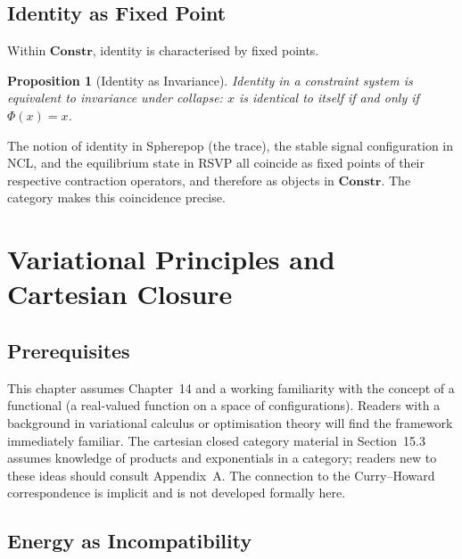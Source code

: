 \documentclass[12pt, oneside]{amsbook}
\theoremstyle{plain}
\newtheorem{proposition}[theorem]{Proposition}
\theoremstyle{definition}
\theoremstyle{remark}
\begin{document}
\section{Identity as Fixed Point}
\label{sec:constr:identity}

Within $\mathbf{Constr}$, identity is characterised by fixed points.

\begin{proposition}[Identity as Invariance]
Identity in a constraint system is equivalent to invariance under collapse:
$x$ is identical to itself if and only if $\Phi(x) = x$.
\end{proposition}

The notion of identity in Spherepop (the trace), the stable signal
configuration in NCL, and the equilibrium state in RSVP all coincide as fixed
points of their respective contraction operators, and therefore as objects in
$\mathbf{Constr}$. The category makes this coincidence precise.


\chapter{Variational Principles and Cartesian Closure}
\label{ch:variational}

\section{Prerequisites}

This chapter assumes Chapter~14 and a working familiarity with the concept of a functional (a real-valued function on a space of configurations). Readers with a background in variational calculus or optimisation theory will find the framework immediately familiar. The cartesian closed category material in Section~15.3 assumes knowledge of products and exponentials in a category; readers new to these ideas should consult Appendix~A. The connection to the Curry--Howard correspondence is implicit and is not developed formally here.

\section{Energy as Incompatibility}
\label{sec:var:energy}
\end{document}
